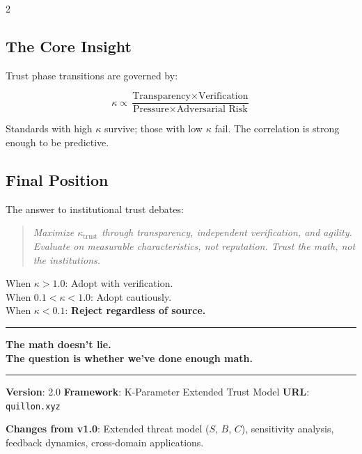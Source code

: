 \documentclass[11pt]{article}
\begin{document}
\begin{multicols}{2}
\subsection{The Core Insight}

Trust phase transitions are governed by:

\begin{equation}
\kappa \propto \frac{\text{Transparency} \times \text{Verification}}{\text{Pressure} \times \text{Adversarial Risk}}
\end{equation}

Standards with high $\kappa$ survive; those with low $\kappa$ fail. The correlation is strong enough to be predictive.

\subsection{Final Position}

The answer to institutional trust debates:

\begin{quote}
\textit{Maximize $\kappa_{\text{trust}}$ through transparency, independent verification, and agility. Evaluate on measurable characteristics, not reputation. Trust the math, not the institutions.}
\end{quote}

When $\kappa > 1.0$: Adopt with verification.\\
When $0.1 < \kappa < 1.0$: Adopt cautiously.\\
When $\kappa < 0.1$: \textbf{Reject regardless of source.}

\vspace{0.5em}
\hrule
\vspace{0.3em}

\textbf{The math doesn't lie.\\The question is whether we've done enough math.}

\end{multicols}

\vspace{0.5em}
\hrule
\vspace{0.3em}
\small
\noindent\textbf{Version}: 2.0 \hfill \textbf{Framework}: K-Parameter Extended Trust Model \hfill \textbf{URL}: \texttt{quillon.xyz}

\vspace{0.3em}
\noindent\textbf{Changes from v1.0}: Extended threat model ($S$, $B$, $C$), sensitivity analysis, feedback dynamics, cross-domain applications.
\end{document}

